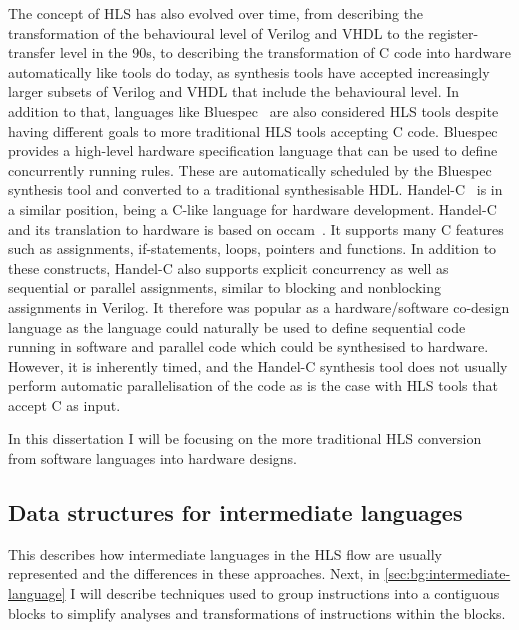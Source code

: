 The concept of \gls{HLS} has also evolved over time, from describing the
transformation of the behavioural level of Verilog and VHDL to the
register-transfer level in the 90s, to describing the transformation of C code
into hardware automatically like tools do today, as synthesis tools have
accepted increasingly larger subsets of Verilog and VHDL that include the
behavioural level.  In addition to that, languages like
Bluespec~\cite{nikhil04_bsv} are also considered \gls{HLS} tools despite having
different goals to more traditional \gls{HLS} tools accepting C code.  Bluespec
provides a high-level hardware specification language that can be used to define
concurrently running rules.  These are automatically scheduled by the Bluespec
synthesis tool and converted to a traditional synthesisable \gls{HDL}.
Handel-C~\cite{aubury96_handel_c_languag_refer_guide,bowen98_hclrm} is in a
similar position, being a C-like language for hardware development.
Handel-C and its translation to hardware is based on occam~\cite{page91_compil_occam}.
It supports
many C features such as assignments, if-statements, loops, pointers and
functions.  In addition to these constructs, Handel-C also supports explicit
concurrency as well as sequential or parallel assignments, similar to blocking
and nonblocking assignments in Verilog.  It therefore was popular as a
hardware/software co-design language as the language could naturally be used to
define sequential code running in software and parallel code which could be
synthesised to hardware.  However, it is inherently timed, and the Handel-C
synthesis tool does not usually perform automatic parallelisation of the code as
is the case with \gls{HLS} tools that accept C as input.

In this dissertation I will be focusing on the more traditional \gls{HLS}
conversion from software languages into hardware designs.

\subsection{Data structures for intermediate languages}%
\label{sec:bg:data-structures-for-intermediate-languages}

This  describes how
intermediate languages in the \gls{HLS} flow are usually represented and the
differences in these approaches.  Next, in \cref{sec:bg:intermediate-language} I
will describe techniques used to group instructions into a contiguous blocks to
simplify analyses and transformations of instructions within the blocks.

